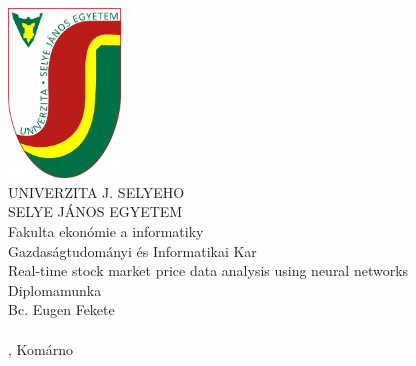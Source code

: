 \documentclass[a4paper,oneside,onecolumn,12pt]{LegrandOrangeBook}
\begin{document}
\thispagestyle{empty}
\begin{minipage}[c][\textheight][c]{\textwidth}
	{\centering
	\includegraphics[keepaspectratio,width=3cm]{SelyeBanner.png}\\
	\vskip0.5cm
	{\LARGE UNIVERZITA J. SELYEHO}\\
	\vskip0.5cm
	{\LARGE SELYE JÁNOS EGYETEM}\\
    \vskip0.5cm
	{\large Fakulta ekonómie a informatiky}\\
	\vskip0.5cm
	{\large Gazdaságtudományi és Informatikai Kar}\\
	\vfill
	{\Huge Real-time stock market price data analysis using neural networks}\\
	Diplomamunka\\
	Bc. Eugen Fekete \\
    \ISBN\\
	\hfill\the\year{}, Komárno\hfill
	}
\end{minipage}
\end{document}
